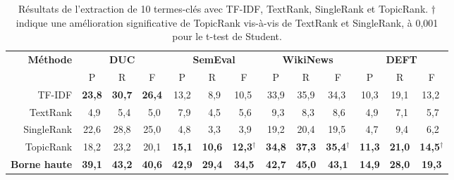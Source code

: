     \begin{table}
      \centering
      \begin{tabular}{@{~}r@{~~}c@{~~}c@{~~}c@{~~}c@{~~}c@{~~}c@{~~}c@{~~}c@{~~}c@{~~}c@{~~}c@{~~}c@{~}}
        \toprule
        \multirow{2}{*}[-2pt]{\textbf{Méthode}} & \multicolumn{3}{c}{\textbf{DUC}} & \multicolumn{3}{c}{\textbf{SemEval}} & \multicolumn{3}{c}{\textbf{WikiNews}} & \multicolumn{3}{c}{\textbf{DEFT}}\\
        \cmidrule(r){2-4}\cmidrule(r){5-7}\cmidrule(r){8-10}\cmidrule{11-13}
        & P & R & F & P & R & F & P & R & F & P & R & F\\
        \midrule
        TF-IDF & \textbf{23,8} & \textbf{30,7} & \textbf{26,4} & 13,2 & $~~$8,9 & 10,5$^{~}$ & 33,9 & 35,9 & 34,3$^{~}$ & 10,3 & 19,1 & 13,2$^{~}$\\
        TextRank & $~~$4,9 & $~~$5,4 & $~~$5,0 & $~~$7,9 & $~~$4,5 & $~~$5,6$^{~}$ & $~~$9,3 & $~~$8,3 & $~~$8,6$^{~}$ & $~~$4,9 & $~~$7,1 & $~~$5,7$^{~}$\\
        SingleRank & 22,6 & 28,8 & 25,0 & $~~$4,8 & $~~$3,3 & $~~$3,9$^{~}$ & 19,2 & 20,4 & 19,5$^{~}$ & $~~$4,7 & $~~$9,4 & $~~$6,2$^{~}$\\
        TopicRank & 18,2 & 23,2 & 20,1 & \textbf{15,1} & \textbf{10,6} & \textbf{12,3}$^\dagger$ & \textbf{34,8} & \textbf{37,3} & \textbf{35,4}$^\dagger$ & \textbf{11,3} & \textbf{21,0} & \textbf{14,5}$^\dagger$\\
        \midrule
        \textbf{Borne haute} & \textbf{39,1} & \textbf{43,2} & \textbf{40,6} & \textbf{42,9} & \textbf{29,4} & \textbf{34,5} & \textbf{42,7} & \textbf{45,0} & \textbf{43,1} & \textbf{14,9} & \textbf{28,0} & \textbf{19,3}\\
        \bottomrule
      \end{tabular}
      \caption{Résultats de l'extraction de 10 termes-clés avec TF-IDF,
               TextRank, SingleRank et TopicRank. $\dagger$ indique une
               amélioration significative de TopicRank vis-à-vis de TextRank et
               SingleRank, à 0,001 pour le t-test de Student.
               \label{tab:resultats_globaux}}
    \end{table}

